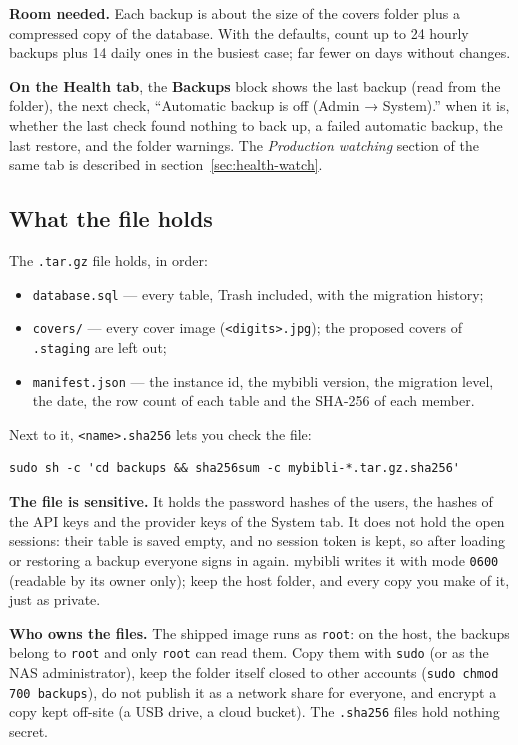 \textbf{Room needed.} Each backup is about the size of the covers
folder plus a compressed copy of the database. With the defaults,
count up to 24 hourly backups plus 14 daily ones in the busiest case;
far fewer on days without changes.

\textbf{On the Health tab}, the \textbf{Backups} block shows the last
backup (read from the folder), the next check, ``Automatic backup is
off (Admin → System).'' when it is, whether the last check found
nothing to back up, a failed automatic backup, the last restore, and
the folder warnings. The \emph{Production watching} section of the
same tab is described in section~\ref{sec:health-watch}.

\subsection*{What the file holds}

The \texttt{.tar.gz} file holds, in order:
\begin{itemize}
  \item \texttt{database.sql} — every table, Trash included, with the
        migration history;
  \item \texttt{covers/} — every cover image (\texttt{<digits>.jpg});
        the proposed covers of \texttt{.staging} are left out;
  \item \texttt{manifest.json} — the instance id, the mybibli version,
        the migration level, the date, the row count of each table and
        the SHA-256 of each member.
\end{itemize}
Next to it, \texttt{<name>.sha256} lets you check the file:
\begin{lstlisting}
sudo sh -c 'cd backups && sha256sum -c mybibli-*.tar.gz.sha256'
\end{lstlisting}

\textbf{The file is sensitive.} It holds the
password hashes of the users, the hashes of the API keys and the
provider keys of the System tab. It does not hold the open sessions:
their table is saved empty, and no session token is kept, so after loading or restoring a backup
everyone signs in again. mybibli writes it with mode
\texttt{0600} (readable by its owner only); keep the host folder, and
every copy you make of it, just as private.

\textbf{Who owns the files.} The shipped image runs as
\texttt{root}: on the host, the backups belong to \texttt{root} and
only \texttt{root} can read them. Copy them with \texttt{sudo} (or as
the NAS administrator), keep the folder itself closed to other
accounts (\texttt{sudo chmod 700 backups}), do not publish it as a
network share for everyone, and encrypt a copy kept off-site (a USB
drive, a cloud bucket). The \texttt{.sha256} files hold nothing
secret.

